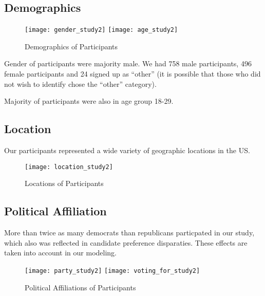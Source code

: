 \subsection{Demographics}
\begin{figure}[H] 
\centering 
  \texttt{[image: gender\_study2]} 
  \texttt{[image: age\_study2]} 
  \caption{Demographics of Participants
    \label{fig:demographics2}}
\end{figure}

Gender of participants were majority male. We had 758 male participants, 496 female participants and 24 signed up as ``other'' (it is possible that those who did not wish to identify chose the ``other'' category). 

Majority of participants were also in age group 18-29.
  

\subsection{Location}

Our participants represented a wide variety of geographic locations in the US.

\begin{figure}[H]  
\centering  
  \texttt{[image: location\_study2]} 
  \caption{Locations of Participants
    \label{fig:locations2}}
\end{figure}

\subsection{Political Affiliation}

More than twice as many democrats than republicans particpated in our study, which also was reflected in candidate preference disparaties. These effects are taken into account in our modeling.

\begin{figure}[H]  
\centering 
  \texttt{[image: party\_study2]} 
  \texttt{[image: voting\_for\_study2]}  
  \caption{Political Affiliations of Participants
    \label{fig:political2}}
\end{figure}

 
  


